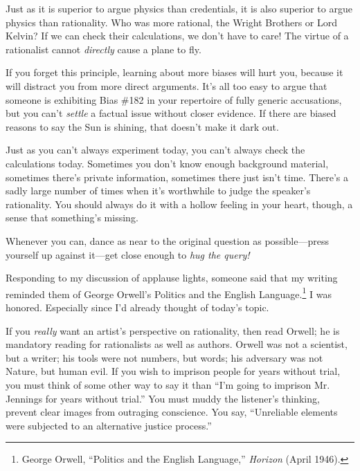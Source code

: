 {
 Just as it is superior to argue physics than credentials, it is
also superior to argue physics than rationality. Who was more rational,
the Wright Brothers or Lord Kelvin? If we can check their calculations,
we don't have to care! The virtue of a rationalist
cannot \textit{directly} cause a plane to fly.}

{
 If you forget this principle, learning about more biases will hurt
you, because it will distract you from more direct arguments.
It's all too easy to argue that someone is exhibiting
Bias \#182 in your repertoire of fully generic accusations, but you
can't \textit{settle} a factual issue without closer
evidence. If there are biased reasons to say the Sun is shining, that
doesn't make it dark out.}

{
 Just as you can't always experiment today, you
can't always check the calculations today. Sometimes
you don't know enough background material, sometimes
there's private information, sometimes there just
isn't time. There's a sadly large
number of times when it's worthwhile to judge the
speaker's rationality. You should always do it with a
hollow feeling in your heart, though, a sense that
something's missing.}

{
 Whenever you can, dance as near to the original question as
possible---press yourself up against it---get close enough to
\textit{hug the query!}}

\myendsectiontext


\bigskip


{
 Responding to my discussion of applause lights, someone said that
my writing reminded them of George Orwell's Politics
and the English Language.\footnote{George Orwell, ``Politics and the English
Language,'' \textit{Horizon} (April 1946).} I was honored. Especially
since I'd already thought of today's
topic. }

{
 If you \textit{really} want an artist's
perspective on rationality, then read Orwell; he is mandatory reading
for rationalists as well as authors. Orwell was not a scientist, but a
writer; his tools were not numbers, but words; his adversary was not
Nature, but human evil. If you wish to imprison people for years
without trial, you must think of some other way to say it than
``I'm going to imprison Mr. Jennings
for years without trial.'' You must muddy the
listener's thinking, prevent clear images from
outraging conscience. You say, ``Unreliable elements
were subjected to an alternative justice process.''}

